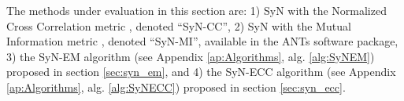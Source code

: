 The methods under evaluation in this section are: 1) SyN with the Normalized Cross Correlation metric \citep{Avants2008, Avants2011}, denoted ``SyN-CC'', 2) SyN with the Mutual Information metric \citep{Mattes2003, Avants2011}, denoted ``SyN-MI'', available in the ANTs software package, 3) the SyN-EM algorithm (see Appendix \ref{ap:Algorithms}, alg. \ref{alg:SyNEM}) proposed in section \ref{sec:syn_em}, and 4) the SyN-ECC algorithm (see Appendix \ref{ap:Algorithms}, alg. \ref{alg:SyNECC}) proposed in section \ref{sec:syn_ecc}. 